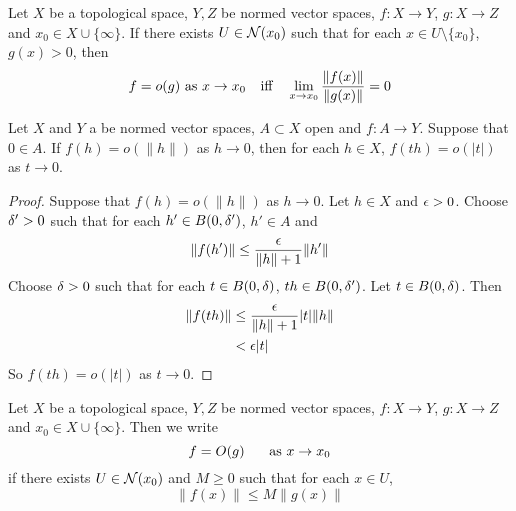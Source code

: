 \documentclass{book}
\begin{document}
	\begin{ex} \lex{}
	Let $X$ be a topological space, $Y, Z$ be normed vector spaces, $f:X \rightarrow Y$, $g: X \rightarrow Z$ and $x_0 \in X \cup \{\infty\}$. If there exists $U \in \mathcal{N}(x_0)$ such that for each $x \in U \setminus \{x_0\}$, $g(x) > 0$, then $$f = o(g) \text{ as } x \rightarrow x_0 \hspace{.25cm} \text{ iff } \hspace{.25cm}  \lim_{x \rightarrow x_0} \frac{\| f(x) \|}{\| g(x) \|} = 0$$
	\end{ex}	
	
	\begin{ex} \lex{}
	Let $X$ and $Y$ a be normed vector spaces, $A \subset X$ open and $f:A \rightarrow Y$. Suppose that $0 \in A$. If $f(h) = o(\|h\|)$ as $h \rightarrow 0$, then for each $h \in X$,  $f(th) = o(|t|)$ as $t \rightarrow 0$.
	\end{ex}	
	
	\begin{proof}
	Suppose that $f(h) = o(\|h\|)$ as $h \rightarrow 0$.  Let $h \in X$ and $\epsilon >0$. Choose $\delta' >0 $ such that for each $h' \in B(0, \delta')$, $h' \in A$ and 
	$$\|f(h')\| \leq \frac{\epsilon}{\|h\|+1} \|h'\|$$ 
	Choose $\delta >0$ such that for each $t \in B(0,\delta)$, $th \in B(0,\delta')$. Let $t \in B(0,\delta)$. Then 
	\begin{align*}
	\|f(th)\| 
	&\leq \frac{\epsilon}{\|h\|+1} |t|\|h\| \\
	&< \epsilon |t|
	\end{align*}
	So $f(th) = o(|t|)$ as $t \rightarrow 0$.
	\end{proof}		
	
	
	
	
	\begin{defn} \ld{}
	Let $X$ be a topological space, $Y, Z$ be normed vector spaces, $f:X \rightarrow Y$, $g: X \rightarrow Z$ and $x_0 \in X \cup \{\infty\}$. Then we write $$f = O(g) \hspace{.5cm} \text{ as } x \rightarrow x_0$$ if there exists $U \in \mathcal{N}(x_0)$ and $M \geq 0$ such that for each $x \in U$, $$\|f(x)\| \leq M\|g(x)\|$$
	\end{defn}
	
	
	
	
	
	
	
\end{document}
